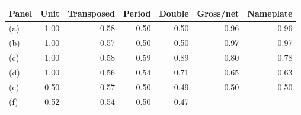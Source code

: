 \begin{tabular}{lrrrrrr}
\hline
Panel & Unit & Transposed & Period & Double & Gross/net & Nameplate \\
\hline
(a) & 1.00 & 0.58 & 0.50 & 0.50 & 0.96 & 0.96 \\
(b) & 1.00 & 0.57 & 0.50 & 0.50 & 0.97 & 0.97 \\
(c) & 1.00 & 0.58 & 0.59 & 0.89 & 0.80 & 0.78 \\
(d) & 1.00 & 0.56 & 0.54 & 0.71 & 0.65 & 0.63 \\
(e) & 0.50 & 0.57 & 0.50 & 0.49 & 0.50 & 0.50 \\
(f) & 0.52 & 0.54 & 0.50 & 0.47 & -- & -- \\
\hline
\end{tabular}
